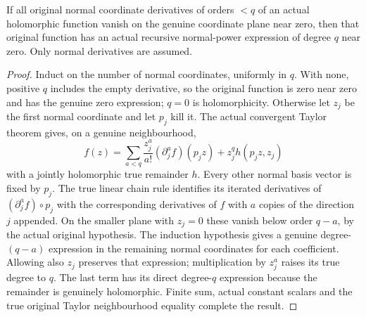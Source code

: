 \begin{lemma}
\label{hir:relative-normal-actual-normal-vanishing-taylor}
\leanok
If all original normal coordinate derivatives of orders $<q$ of an actual
holomorphic function vanish on the genuine coordinate plane near zero, then
that original function has an actual recursive normal-power expression of
degree $q$ near zero. Only normal derivatives are assumed.
\end{lemma}
\begin{proof}
Induct on the number of normal coordinates, uniformly in $q$. With none,
positive $q$ includes the empty derivative, so the original function is zero
near zero and has the genuine zero expression; $q=0$ is holomorphicity.
Otherwise let $z_j$ be the first normal coordinate and let $p_j$ kill it. The
actual convergent Taylor theorem gives, on a genuine neighbourhood,
\[
 f(z)=\sum_{a<q}\frac{z_j^a}{a!}
       (\partial_j^a f)(p_jz)+z_j^q h(p_jz,z_j)
\]
with a jointly holomorphic true remainder $h$. Every other normal basis
vector is fixed by $p_j$. The true linear chain rule identifies its iterated
derivatives of $(\partial_j^a f)\circ p_j$ with the corresponding derivatives
of $f$ with $a$ copies of the direction $j$ appended. On the smaller plane
with $z_j=0$ these vanish below order $q-a$, by the actual original hypothesis.
The induction hypothesis gives a genuine degree-$(q-a)$ expression in the
remaining normal coordinates for each coefficient. Allowing also $z_j$
preserves that expression; multiplication by $z_j^a$ raises its true degree
to $q$. The last term has its direct degree-$q$ expression because the
remainder is genuinely holomorphic. Finite sum, actual constant scalars and
the true original Taylor neighbourhood equality complete the result.
\end{proof}

